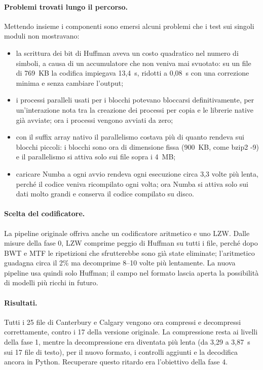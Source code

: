 \documentclass[11pt,a4paper]{article}
\begin{document}
\paragraph{Problemi trovati lungo il percorso.} Mettendo insieme i componenti sono emersi
alcuni problemi che i test sui singoli moduli non mostravano:
\begin{itemize}
  \item la scrittura dei bit di Huffman aveva un costo quadratico nel numero di simboli, a
        causa di un accumulatore che non veniva mai svuotato: su un file di 769~KB la codifica
        impiegava 13,4~s, ridotti a 0,08~s con una correzione minima e senza cambiare l'output;
  \item i processi paralleli usati per i blocchi potevano bloccarsi definitivamente, per
        un'interazione nota tra la creazione dei processi per copia e le librerie native già
        avviate; ora i processi vengono avviati da zero;
  \item con il suffix array nativo il parallelismo costava più di quanto rendeva sui blocchi
        piccoli: i blocchi sono ora di dimensione fissa (900~KB, come bzip2 -9) e il
        parallelismo si attiva solo sui file sopra i 4~MB;
  \item caricare Numba a ogni avvio rendeva ogni esecuzione circa 3,3 volte più lenta, perché
        il codice veniva ricompilato ogni volta; ora Numba si attiva solo sui dati molto
        grandi e conserva il codice compilato su disco.
\end{itemize}

\paragraph{Scelta del codificatore.} La pipeline originale offriva anche un codificatore
aritmetico e uno LZW. Dalle misure della fase 0, LZW comprime peggio di Huffman su tutti i
file, perché dopo BWT e MTF le ripetizioni che sfrutterebbe sono già state eliminate;
l'aritmetico guadagna circa il 2\% ma decomprime 8--10 volte più lentamente. La nuova
pipeline usa quindi solo Huffman; il campo nel formato lascia aperta la possibilità di
modelli più ricchi in futuro.

\paragraph{Risultati.} Tutti i 25 file di Canterbury e Calgary vengono ora compressi e
decompressi correttamente, contro i 17 della versione originale. La compressione resta ai
livelli della fase 1, mentre la decompressione era diventata più lenta (da 3,29 a 3,87~s
sui 17 file di testo), per il nuovo formato, i controlli aggiunti e la decodifica ancora in
Python. Recuperare questo ritardo era l'obiettivo della fase 4.
\end{document}

